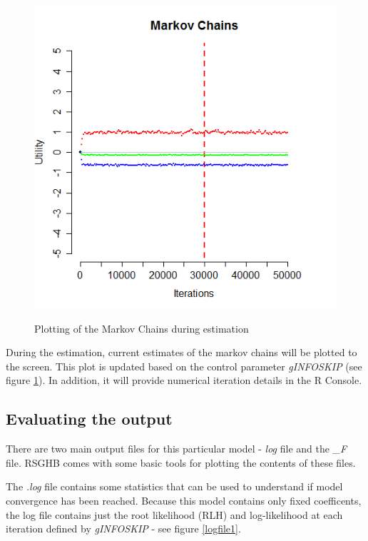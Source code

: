 \documentclass{article}
\begin{document}
\begin{figure}
\caption{Plotting of the Markov Chains during estimation}
\includegraphics[scale=0.50]{MNL_markovChains.png}
\label{MarkovChain}
\end{figure}

During the estimation, current estimates of the markov chains will be plotted to the screen. This plot is updated based on the control parameter \emph{gINFOSKIP} (see figure \ref{MarkovChain}). In addition, it will provide numerical iteration details in the R Console.



\subsection*{Evaluating the output}

There are two main output files for this particular model - \emph{log} file and the \emph{\_F} file. RSGHB comes with some basic tools for plotting the contents of these files.

The \emph{.log} file contains some statistics that can be used to understand if model convergence has been reached. Because this model contains only fixed coefficents, the log file contains just the root likelihood (RLH) and log-likelihood at each iteration defined by \emph{gINFOSKIP} - see figure \ref{logfile1}.
\end{document}
